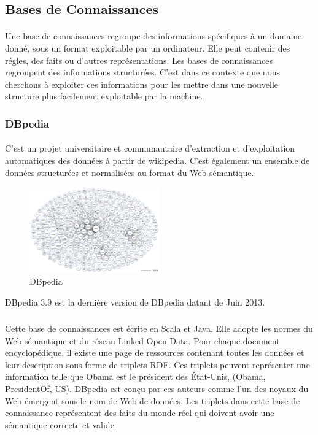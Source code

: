 \documentclass[12pt,a4]{report}
\begin{document}
\subsection{Bases de Connaissances}
\paragraph{}
Une base de connaissances regroupe des informations spécifiques à un domaine donné, sous un format exploitable par un ordinateur. Elle peut contenir des régles, des faits ou d'autres représentations. Les bases de connaissances regroupent des informations structurées. C’est dans ce contexte que nous cherchons à exploiter ces informations pour les mettre dans une nouvelle structure plus facilement exploitable par la machine. 

\subsubsection{DBpedia}
\paragraph{}

C'est un projet universitaire et communautaire d’extraction et d’exploitation automatiques des données à partir de wikipedia. C’est également un ensemble de données structurées et normalisées au format du Web sémantique.
\begin{figure}
\vspace{-10pt}
\begin{center}
\includegraphics[width=0.50\textwidth]{dbpedia.png}
\end{center}
\vspace{-15pt}
\caption{DBpedia}
\vspace{-10pt}
\end{figure}
DBpedia 3.9 est la dernière version de DBpedia datant de Juin 2013.
\subparagraph{}
Cette base de connaissances est écrite en Scala et Java. Elle adopte les normes du Web sémantique et du réseau Linked Open Data. Pour chaque document encyclopédique, il existe une page de ressources contenant toutes les données et leur description sous forme de triplets RDF. Ces triplets peuvent représenter une information telle que Obama est le président des État-Unis, (Obama, PresidentOf, US).
DBpedia est conçu par ces auteurs comme l'un des noyaux du Web émergent sous le nom de Web de données. Les triplets dans cette base de connaissance représentent des faits du monde réel qui doivent avoir une sémantique correcte et valide.
\end{document}
